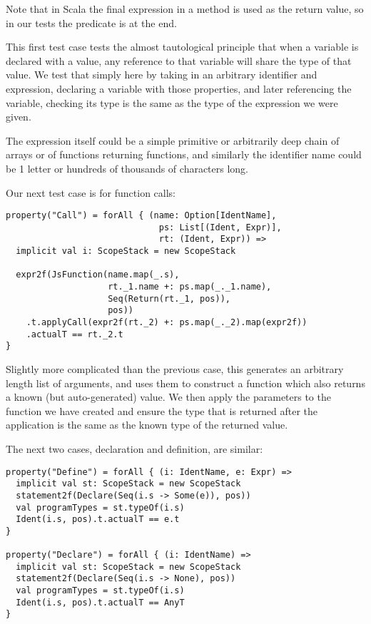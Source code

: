 \documentclass[british, twoside, openright]{bhamthesis}
\theoremstyle{definition}
\begin{document}
      Note that in Scala the final expression in a method is used as the return value, so in our tests the predicate is at the end.

      This first test case tests the almost tautological principle that when a variable is declared with a value, any reference to that variable will share the type of that value. We test that simply here by taking in an arbitrary identifier and expression, declaring a variable with those properties, and later referencing the variable, checking its type is the same as the type of the expression we were given.

      The expression itself could be a simple primitive or arbitrarily deep chain of arrays or of functions returning functions, and similarly the identifier name could be 1 letter or hundreds of thousands of characters long.

      Our next test case is for function calls:

      \begin{lstlisting}
property("Call") = forAll { (name: Option[IdentName],
                              ps: List[(Ident, Expr)],
                              rt: (Ident, Expr)) =>
  implicit val i: ScopeStack = new ScopeStack

  expr2f(JsFunction(name.map(_.s),
                    rt._1.name +: ps.map(_._1.name),
                    Seq(Return(rt._1, pos)),
                    pos))
    .t.applyCall(expr2f(rt._2) +: ps.map(_._2).map(expr2f))
    .actualT == rt._2.t
}
      \end{lstlisting}

      Slightly more complicated than the previous case, this generates an arbitrary length list of arguments, and uses them to construct a function which also returns a known (but auto-generated) value. We then apply the parameters to the function we have created and ensure the type that is returned after the application is the same as the known type of the returned value.

      The next two cases, declaration and definition, are similar:

      \begin{lstlisting}
property("Define") = forAll { (i: IdentName, e: Expr) =>
  implicit val st: ScopeStack = new ScopeStack
  statement2f(Declare(Seq(i.s -> Some(e)), pos))
  val programTypes = st.typeOf(i.s)
  Ident(i.s, pos).t.actualT == e.t
}

property("Declare") = forAll { (i: IdentName) =>
  implicit val st: ScopeStack = new ScopeStack
  statement2f(Declare(Seq(i.s -> None), pos))
  val programTypes = st.typeOf(i.s)
  Ident(i.s, pos).t.actualT == AnyT
}
      \end{lstlisting}
\end{document}
